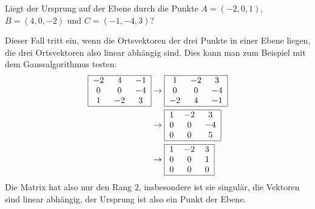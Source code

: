 Liegt der Ursprung  auf der Ebene durch die Punkte
$A=(-2, 0, 1)$, $B=(4,0,-2)$ und $C=(-1,-4,3)$?

\begin{loesung}
Dieser Fall tritt ein, wenn die Ortsvektoren der drei Punkte
in einer Ebene liegen, die drei Ortsvektoren also linear abhängig
sind. Dies kann man zum Beispiel mit dem Gaussalgorithmus testen:
\begin{align*}
\begin{tabular}{|ccc|}
\hline
$-2$&4&$-1$\\
0&0&$-4$\\
1&$-2$&3\\
\hline
\end{tabular}
&\rightarrow
\begin{tabular}{|ccc|}
\hline
1&$-2$&3\\
0&0&$-4$\\
$-2$&4&$-1$\\
\hline
\end{tabular}
\\
&\rightarrow
\begin{tabular}{|ccc|}
\hline
1&$-2$&3\\
0&0&$-4$\\
0&0&5\\
\hline
\end{tabular}
\\
&\rightarrow
\begin{tabular}{|ccc|}
\hline
1&$-2$&3\\
0&0&1\\
0&0&0\\
\hline
\end{tabular}
\end{align*}
Die Matrix hat also nur den Rang $2$, insbesondere ist sie singulär,
die Vektoren sind linear abhängig, der Ursprung ist also ein Punkt
der Ebene.


\end{loesung}
